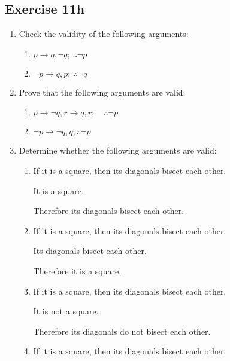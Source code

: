 \documentclass{report}
\begin{document}
\subsection*{Exercise 11h}
\begin{enumerate}[leftmargin=*]
    \item Check the validity of the following arguments:
          \begin{enumerate}[leftmargin=*]
              \item $p \rightarrow q, \neg q ;\ \therefore \neg p$
              \item $\neg p \rightarrow q, p ;\ \therefore \neg q$
          \end{enumerate}

    \item Prove that the following arguments are valid:
          \begin{enumerate}[leftmargin=*]
              \item $p \rightarrow \neg q, r \rightarrow q, r ; \quad \therefore \neg p$
              \item $\neg p \rightarrow \neg q, q ; \therefore \neg p$
          \end{enumerate}

    \item Determine whether the following arguments are valid:
          \begin{enumerate}[leftmargin=*]
              \item If it is a square, then its diagonals bisect each other.

                    It is a square.

                    Therefore its diagonals bisect each other.

              \item If it is a square, then its diagonals bisect each other.

                    Its diagonals bisect each other.

                    Therefore it is a square.

              \item If it is a square, then its diagonals bisect each other.

                    It is not a square.

                    Therefore its diagonals do not bisect each other.

              \item If it is a square, then its diagonals bisect each other.


\end{enumerate}
\end{enumerate}
\end{document}
